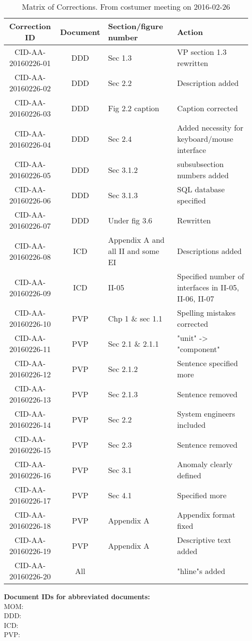 \begin{table}[ht]
\centering
\begin{tabular}{|c|c|>{\centering\arraybackslash}p{3cm}|>{\centering\arraybackslash}p{5cm}|}
\hline \textbf{Correction ID} & \textbf{Document} & \textbf{Section/figure number} & \textbf{Action} \\
\hline CID-AA-20160226-01 & DDD & Sec 1.3 & VP section 1.3 rewritten\\
\hline CID-AA-20160226-02 & DDD & Sec 2.2 & Description added\\
\hline CID-AA-20160226-03 & DDD & Fig 2.2 caption & Caption corrected\\
\hline CID-AA-20160226-04 & DDD & Sec 2.4 & Added necessity for keyboard/mouse interface\\
\hline CID-AA-20160226-05 & DDD & Sec 3.1.2 & subsubsection numbers added\\
\hline CID-AA-20160226-06 & DDD & Sec 3.1.3 & SQL database specified\\
\hline CID-AA-20160226-07 & DDD & Under fig 3.6 & Rewritten\\
\hline CID-AA-20160226-08 & ICD & Appendix A and all II and some EI & Descriptions added \\
\hline CID-AA-20160226-09 & ICD & II-05 & Specified number of interfaces in II-05, II-06, II-07\\
\hline CID-AA-20160226-10 & PVP & Chp 1 \& sec 1.1 & Spelling mistakes corrected\\
\hline CID-AA-20160226-11 & PVP & Sec 2.1 \& 2.1.1 & "unit" -> "component"\\
\hline CID-AA-20160226-12 & PVP & Sec 2.1.2 & Sentence specified more\\
\hline CID-AA-20160226-13 & PVP & Sec 2.1.3 & Sentence removed\\
\hline CID-AA-20160226-14 & PVP & Sec 2.2 & System engineers included\\
\hline CID-AA-20160226-15 & PVP & Sec 2.3 & Sentence removed\\
\hline CID-AA-20160226-16 & PVP & Sec 3.1 & Anomaly clearly defined\\
\hline CID-AA-20160226-17 & PVP & Sec 4.1 & Specified more\\
\hline CID-AA-20160226-18 & PVP & Appendix A & Appendix format fixed\\
\hline CID-AA-20160226-19 & PVP & Appendix A & Descriptive text added\\
\hline CID-AA-20160226-20 & All &  & "hline"s added\\
\hline 
\end{tabular}
\caption{Matrix of Corrections. From costumer meeting on 2016-02-26}
\label{tb:MoC} 
\end{table}

\vspace{20pt}
\noindent \textbf{Document IDs for abbreviated documents:}\\
MOM:        \momFebTwentySix \\
DDD:        \ddd \\
ICD:        \icd \\
PVP:        \pvp \\